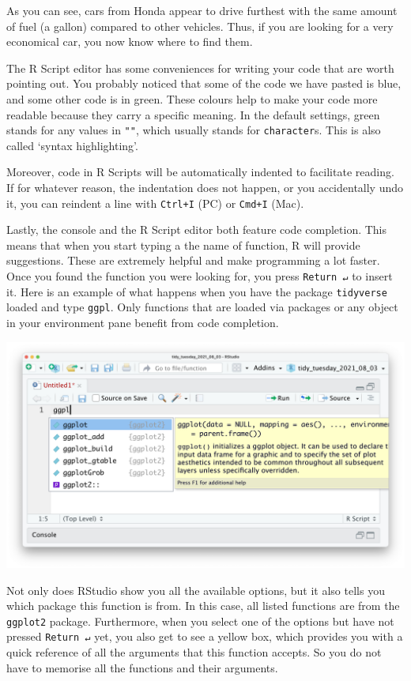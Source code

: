 \documentclass[
]{book}
\begin{document}
As you can see, cars from Honda appear to drive furthest with the same amount of fuel (a gallon) compared to other vehicles. Thus, if you are looking for a very economical car, you now know where to find them.

The R Script editor has some conveniences for writing your code that are worth pointing out. You probably noticed that some of the code we have pasted is blue, and some other code is in green. These colours help to make your code more readable because they carry a specific meaning. In the default settings, green stands for any values in \texttt{""}, which usually stands for \texttt{character}s. This is also called `syntax highlighting'.

Moreover, code in R Scripts will be automatically indented to facilitate reading. If for whatever reason, the indentation does not happen, or you accidentally undo it, you can reindent a line with \texttt{Ctrl+I} (PC) or \texttt{Cmd+I} (Mac).

Lastly, the console and the R Script editor both feature code completion. This means that when you start typing a the name of function, R will provide suggestions. These are extremely helpful and make programming a lot faster. Once you found the function you were looking for, you press \texttt{Return\ ↵} to insert it. Here is an example of what happens when you have the package \texttt{tidyverse} loaded and type \texttt{ggpl}. Only functions that are loaded via packages or any object in your environment pane benefit from code completion.

\includegraphics{images/chapter_06_img/02_r_script/02_r script_code_completion.png}

Not only does RStudio show you all the available options, but it also tells you which package this function is from. In this case, all listed functions are from the \texttt{ggplot2} package. Furthermore, when you select one of the options but have not pressed \texttt{Return\ ↵} yet, you also get to see a yellow box, which provides you with a quick reference of all the arguments that this function accepts. So you do not have to memorise all the functions and their arguments.
\end{document}
